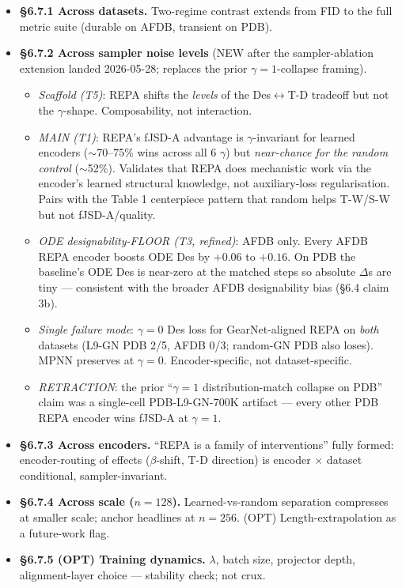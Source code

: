 \documentclass[11pt,a4paper]{article}
\begin{document}
\begin{itemize}[leftmargin=*,itemsep=0pt]
\item \textbf{\S6.7.1 Across datasets.} Two-regime contrast extends from
FID to the full metric suite (durable on AFDB, transient on PDB).
\item \textbf{\S6.7.2 Across sampler noise levels} (NEW after the
sampler-ablation extension landed 2026-05-28; replaces the prior
$\gamma{=}1$-collapse framing).
  \begin{itemize}[leftmargin=*,itemsep=0pt]
  \item \emph{Scaffold (T5)}: REPA shifts the \emph{levels} of the
  Des$\leftrightarrow$T-D tradeoff but not the $\gamma$-shape. Composability,
  not interaction.
  \item \emph{MAIN (T1)}: REPA's fJSD-A advantage is $\gamma$-invariant
  for learned encoders ($\sim$70--75\% wins across all 6 $\gamma$) but
  \emph{near-chance for the random control} ($\sim$52\%). Validates
  that REPA does mechanistic work via the encoder's learned structural
  knowledge, not auxiliary-loss regularisation. Pairs with the Table 1
  centerpiece pattern that random helps T-W/S-W but not fJSD-A/quality.
  \item \emph{ODE designability-FLOOR (T3, refined)}: AFDB only. Every
  AFDB REPA encoder boosts ODE Des by $+0.06$ to $+0.16$. On PDB the
  baseline's ODE Des is near-zero at the matched steps so absolute
  $\Delta$s are tiny --- consistent with the broader AFDB designability
  bias (\S6.4 claim 3b).
  \item \emph{Single failure mode}: $\gamma{=}0$ Des loss for
  GearNet-aligned REPA on \emph{both} datasets (L9-GN PDB 2/5, AFDB 0/3;
  random-GN PDB also loses). MPNN preserves at $\gamma{=}0$.
  Encoder-specific, not dataset-specific.
  \item \emph{RETRACTION}: the prior ``$\gamma{=}1$ distribution-match
  collapse on PDB'' claim was a single-cell PDB-L9-GN-700K artifact ---
  every other PDB REPA encoder wins fJSD-A at $\gamma{=}1$.
  \end{itemize}
\item \textbf{\S6.7.3 Across encoders.} ``REPA is a family of
interventions'' fully formed: encoder-routing of effects ($\beta$-shift,
T-D direction) is encoder $\times$ dataset conditional, sampler-invariant.
\item \textbf{\S6.7.4 Across scale ($n{=}128$).} Learned-vs-random
separation compresses at smaller scale; anchor headlines at $n{=}256$.
(OPT) Length-extrapolation as a future-work flag.
\item \textbf{\S6.7.5 (OPT) Training dynamics.} $\lambda$, batch size,
projector depth, alignment-layer choice --- stability check; not crux.
\end{itemize}
\end{document}
